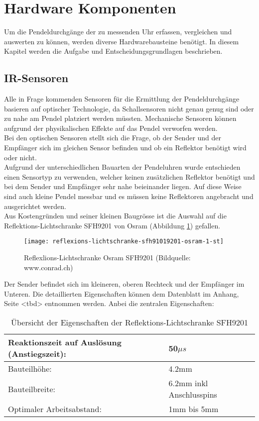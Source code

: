 \section{Hardware Komponenten}
Um die Pendeldurchgänge der zu messenden Uhr erfassen, vergleichen und auswerten zu können, werden diverse Hardwarebausteine benötigt. In diesem Kapitel werden die Aufgabe und Entscheidungsgrundlagen beschrieben.
%
%
\subsection{IR-Sensoren}
\label{cap:sensoren}
	Alle in Frage kommenden Sensoren für die Ermittlung der Pendeldurchgänge basieren auf optischer Technologie, da Schallsensoren nicht genau genug sind oder zu nahe am Pendel platziert werden müssten. Mechanische Sensoren können aufgrund der physikalischen Effekte auf das Pendel verworfen werden.\\
	 Bei den optischen Sensoren stellt sich die Frage, ob der Sender und der Empfänger sich im gleichen Sensor befinden und ob ein Reflektor benötigt wird oder nicht.\\
	Aufgrund der unterschiedlichen Bauarten der Pendeluhren wurde entschieden einen Sensortyp zu verwenden, welcher keinen zusätzlichen Reflektor benötigt und bei dem Sender und Empfänger sehr nahe beieinander liegen. Auf diese Weise sind auch kleine Pendel messbar und es müssen keine Reflektoren angebracht und ausgerichtet werden.\\
	Aus Kostengründen und seiner kleinen Baugrösse ist die Auswahl auf die Reflektions-Lichtschranke SFH9201 von Osram (Abbildung \ref{fig:SFH9201}) gefallen.
	\begin{figure}[H]
        \centering
        \texttt{[image: reflexions-lichtschranke-sfh91019201-osram-1-st]}
        \caption{Reflexlions-Lichtschranke Osram SFH9201 (Bildquelle: www.conrad.ch)}
        \label{fig:SFH9201}
    \end{figure}
	\noindent Der Sender befindet sich im kleineren, oberen Rechteck und der Empfänger im Unteren. Die detaillierten Eigenschaften können dem Datenblatt im Anhang, Seite <tbd> entnommen werden. Anbei die zentralen Eigenschaften: %
	\begin{table}[H]
		\begin{tabular}{|p{11cm}|p{4cm}|}\hline
			Reaktionszeit auf Auslösung (Anstiegszeit): & 50$\mu{s}$ \\ \hline
			Bauteilhöhe:								& 4.2mm\\ \hline
			Bauteilbreite:								& 6.2mm inkl Anschlusspins\\ \hline
			Optimaler Arbeitsabstand:					& 1mm bis 5mm \\ \hline
		\end{tabular}
		\caption{Übersicht der Eigenschaften der Reflektions-Lichtschranke SFH9201}
		\label{tab:SFH9201}
	\end{table}
%
%	
\clearpage
